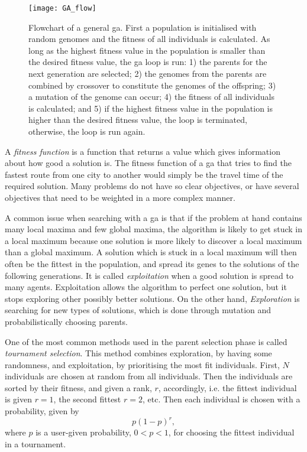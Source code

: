 \begin{figure}[htbp]
    \centering
    \texttt{[image: GA\_flow]}
    \caption[Flowchart of a general \ac{ga}.]{Flowchart of a general \ac{ga}. First a population is initialised with random genomes and the fitness of all individuals is calculated. As long as the highest fitness value in the population is smaller than the desired fitness value, the \ac{ga} loop is run: 1) the parents for the next generation are selected; 2) the genomes from the parents are combined by crossover to constitute the genomes of the offspring; 3) a mutation of the genome can occur; 4) the fitness of all individuals is calculated; and 5) if the highest fitness value in the population is higher than the desired fitness value, the loop is terminated, otherwise, the loop is run again.}
    \label{fig:GA}
\end{figure}

A \textit{fitness function} is a function that returns a value which gives information about how good a solution is. The fitness function of a \ac{ga} that tries to find the fastest route from one city to another would simply be the travel time of the required solution. Many problems do not have so clear objectives, or have several objectives that need to be weighted in a more complex manner.

A common issue when searching with a \ac{ga} is that if the problem at hand contains many local maxima and few global maxima, the algorithm is likely to get stuck in a local maximum because one solution is more likely to discover a local maximum than a global maximum. A solution which is stuck in a local maximum will then often be the fittest in the population, and spread its genes to the solutions of the following generations. It is called \textit{exploitation} when a good solution is spread to many agents. Exploitation allows the algorithm to perfect one solution, but it stops exploring other possibly better solutions. On the other hand, \textit{Exploration} is searching for new types of solutions, which is done through mutation and probabilistically choosing parents. 

One of the most common methods used in the parent selection phase is called \textit{tournament selection}. This method combines exploration, by having some randomness, and exploitation, by prioritising the most fit individuals. First, $N$ individuals are chosen at random from all individuals. Then the individuals are sorted by their fitness, and given a rank, $r$, accordingly, i.e. the fittest individual is given $r=1$, the second fittest $r=2$, etc. Then each individual is chosen with a probability, given by
\begin{equation}
p(1-p)^r,
\end{equation}
where $p$ is a user-given probability, $0 < p < 1$, for choosing the fittest individual in a tournament. 

